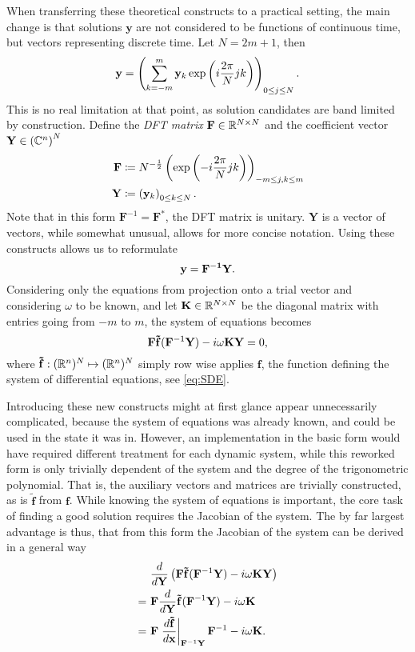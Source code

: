 When transferring these theoretical constructs to a practical setting, the main change is that solutions $\mathbf{y}$ are not considered to be functions of continuous time, but vectors representing discrete time.
Let $N = 2m+1$, then
	\[
		\mathbf{\mathbf{y}} = \left( \sum_{k=-m}^m \mathbf{y}_k \exp\left(i \frac{2\pi}{N} j k\right) \right)_{0 \le j \le N} \text.
	\]
This is no real limitation at that point, as solution candidates are band limited by construction.
Define the \emph{DFT matrix} $\mathbf F \in \mathbb{R}^{N \times N}$ and the coefficient vector $\mathbf Y \in \left(\mathbb{C}^n\right)^N$
	\begin{align*}
		\mathbf{F} &\coloneqq N^{-\frac12} \left( \exp\left(-i \frac{2\pi}{N} j k \right) \right)_{-m \le j,k \le m} \\
		\mathbf{Y} &\coloneqq \left(\mathbf{y}_k\right)_{0 \le k \le N} \text.
	\end{align*}
Note that in this form $\mathbf{F}^{-1} = \mathbf{F}^*$, the DFT matrix is unitary.
$\mathbf Y$ is a vector of vectors, while somewhat unusual, allows for more concise notation.
Using these constructs allows us to reformulate
	\[
			\mathbf{y} = \mathbf{F^{-1}} \mathbf{Y} \text.
	\]
Considering only the equations from projection onto a trial vector and considering $\omega$ to be known, and let $\mathbf K \in \mathbb{R}^{N \times N}$ be the diagonal matrix with entries going from $-m$ to $m$, the system of equations becomes
	\[
		\mathbf{F} \mathbf{\tilde f}(\mathbf F^{-1} \mathbf{Y}) - i \omega \mathbf K \mathbf Y = 0\text,
	\]
where $\mathbf{\tilde f}: (\mathbb{R}^n)^N \mapsto (\mathbb{R}^n)^N$ simply row wise applies $\mathbf{f}$, the function defining the system of differential equations, see \autoref{eq:SDE}.

Introducing these new constructs might at first glance appear unnecessarily complicated, because the system of equations was already known, and could be used in the state it was in.
However, an implementation in the basic form would have required different treatment for each dynamic system, while this reworked form is only trivially dependent of the system and the degree of the trigonometric polynomial.
That is, the auxiliary vectors and matrices are trivially constructed, as is $\mathbf{\tilde f}$ from $\mathbf f$.
While knowing the system of equations is important, the core task of finding a good solution requires the Jacobian of the system.
The by far largest advantage is thus, that from this form the Jacobian of the system can be derived in a general way
	\begin{align}
			& \frac{d}{d \mathbf Y} \left( \mathbf{F} \mathbf{\tilde f}(\mathbf{F}^{-1} \mathbf{Y}) - i \omega \mathbf K \mathbf Y \right) \\
		=\ & \mathbf{F} \frac{d}{d\mathbf Y}\mathbf{\tilde f}(\mathbf{F}^{-1} \mathbf{Y}) - i \omega \mathbf K \\ 
		=\ & \mathbf{F} \left.\frac{d\mathbf{\tilde f}}{d\mathbf x}\right|_{\mathbf{F}^{-1} \mathbf{Y}} \mathbf{F}^{-1} - i \omega \mathbf K \label{eq:vecsys}\text.
	\end{align}
	
